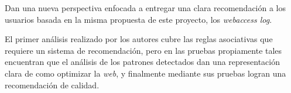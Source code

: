 Dan una nueva perspectiva enfocada a entregar una clara recomendación a los usuarios basada en la misma propuesta de este proyecto, los \emph{webaccess log}.

El primer análisis realizado por los autores cubre las reglas asociativas que requiere un sistema de recomendación, pero en las pruebas propiamente tales encuentran que el análisis de los patrones detectados dan una representación clara de como optimizar la \emph{web}, y finalmente mediante sus pruebas logran una recomendación de calidad.
